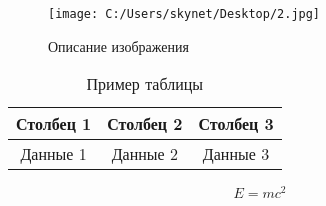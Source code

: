 \documentclass[14pt]{extreport}
\begin{document}
	\begin{figure}[h]
		\centering
		\texttt{[image: C:/Users/skynet/Desktop/2.jpg]}
		\caption{Описание изображения}
		\label{fig:example}
	\end{figure}
	
	\begin{table}[h]
		\centering
		\begin{tabular}{|c|c|c|}
			\hline
			Столбец 1 & Столбец 2 & Столбец 3 \\
			\hline
			Данные 1 & Данные 2 & Данные 3 \\
			\hline
		\end{tabular}
		\caption{Пример таблицы}
		\label{tab:example}
	\end{table}
	
	\begin{equation}
		E = mc^2
	\end{equation}
	
\end{document}
